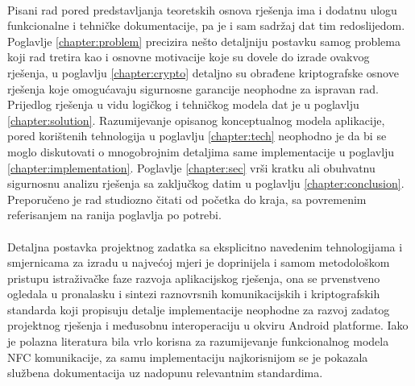 \paragraph*{}
Pisani rad pored predstavljanja teoretskih osnova rješenja ima i dodatnu ulogu funkcionalne i tehničke dokumentacije, pa je i sam sadržaj dat tim redoslijedom. Poglavlje \ref{chapter:problem} precizira nešto detaljniju postavku samog problema koji rad tretira kao i osnovne motivacije koje su dovele do izrade ovakvog rješenja, u poglavlju \ref{chapter:crypto} detaljno su obrađene kriptografske osnove rješenja koje omogućavaju sigurnosne garancije neophodne za ispravan rad. Prijedlog rješenja u vidu logičkog i tehničkog modela dat je u poglavlju \ref{chapter:solution}. Razumijevanje opisanog konceptualnog modela aplikacije, pored korištenih tehnologija u poglavlju \ref{chapter:tech} neophodno je da bi se moglo diskutovati o mnogobrojnim detaljima same implementacije u poglavlju \ref{chapter:implementation}. Poglavlje \ref{chapter:sec} vrši kratku ali obuhvatnu sigurnosnu analizu rješenja sa zaključkog datim u poglavlju \ref{chapter:conclusion}. Preporučeno je rad studiozno čitati od početka do kraja, sa povremenim referisanjem na ranija poglavlja po potrebi.

\paragraph*{}
Detaljna postavka projektnog zadatka sa eksplicitno navedenim tehnologijama i smjernicama za izradu u najvećoj mjeri je doprinijela i samom metodološkom pristupu istraživačke faze razvoja aplikacijskog rješenja, ona se prvenstveno ogledala u pronalasku i sintezi raznovrsnih komunikacijskih i kriptografskih standarda koji propisuju detalje implementacije neophodne za razvoj zadatog projektnog rješenja i međusobnu interoperaciju u okviru Android platforme. Iako je polazna literatura bila vrlo korisna za razumijevanje funkcionalnog modela NFC komunikacije, za samu implementaciju najkorisnijom se je pokazala službena dokumentacija uz nadopunu relevantnim standardima.